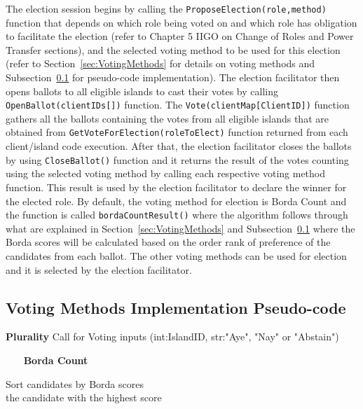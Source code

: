 The election session begins by calling the \texttt{ProposeElection(role,method)} function that depends on which role being voted on and which role has obligation to facilitate the election (refer to Chapter 5 IIGO on Change of Roles and Power Transfer sections), and the selected voting method to be used for this election (refer to Section~\ref{sec:VotingMethods} for details on voting methods and Subsection~\ref{subsec:VotingPseudo} for pseudo-code implementation). The election facilitator then opens ballots to all eligible islands to cast their votes by calling \texttt{OpenBallot(clientIDs[])} function. The \texttt{Vote(clientMap[ClientID])} function gathers all the ballots containing the votes from all eligible islands that are obtained from \texttt{GetVoteForElection(roleToElect)} function returned from each client/island code execution. After that, the election facilitator closes the ballots by using \texttt{CloseBallot()} function and it returns the result of the votes counting using the selected voting method by calling each respective voting method function. This result is used by the election facilitator to declare the winner for the elected role. By default, the voting method for election is Borda Count and the function is called \texttt{bordaCountResult()} where the algorithm follows through what are explained in Section~\ref{sec:VotingMethods} and Subsection~\ref{subsec:VotingPseudo} where the Borda scores will be calculated based on the order rank of preference of the candidates from each ballot. The other voting methods can be used for election and it is selected by the election facilitator.

\subsection{Voting Methods Implementation Pseudo-code}
\label{subsec:VotingPseudo}

\textbf{Plurality}
\newline
Call for Voting inputs (int:IslandID, str:"Aye", "Nay" or "Abstain")\\
\begin{algorithm}[H]
\end{algorithm}

\ \newline \ \newline \ \newline
\textbf{Borda Count}
\newline
\begin{algorithm}[H]
Sort candidates by Borda scores\\
\Return the candidate with the highest score
\end{algorithm}

